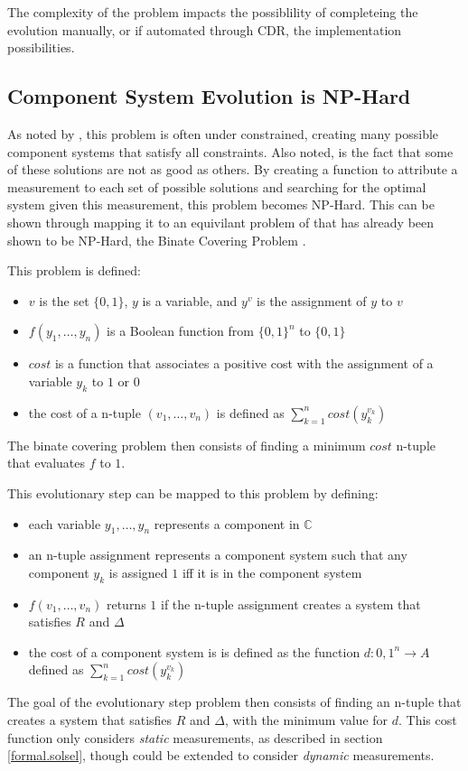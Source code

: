 The complexity of the problem impacts the possiblility of completeing the evolution manually, or if automated through CDR, the implementation possibilities.

\subsection{Component System Evolution is NP-Hard}
As noted by \cite{leberre2008}, this problem is often under constrained, creating many possible component systems that satisfy all constraints.
Also noted, is the fact that some of these solutions are not as good as others.
By creating a function to attribute a measurement to each set of possible solutions and searching for the optimal system given this measurement, this problem becomes NP-Hard. 
This can be shown through mapping it to an equivilant problem of that has already been shown to be NP-Hard, the Binate Covering Problem \cite{Coudert1996}.

This problem is defined:
\begin{itemize}
  \item $v$ is the set $\{0,1\}$, $y$ is a variable, and $y^v$ is the assignment of $y$ to $v$
  \item $f(y_1, \ldots, y_n)$ is a Boolean function from $\{0,1\}^n$ to $\{0,1\}$
  \item $cost$ is a function that associates a positive cost with the assignment of a variable $y_k$ to $1$ or $0$
  \item the cost of a n-tuple $(v_1,\ldots,v_n)$ is defined as $\sum^n_{k=1}cost(y^{v_k}_{k})$
\end{itemize}
The binate covering problem then consists of finding a minimum $cost$ n-tuple that evaluates $f$ to $1$.

This evolutionary step can be mapped to this problem by defining:
\begin{itemize}
  \item each variable $y_1,\ldots,y_n$ represents a component in $\mathbb{C}$
  \item an n-tuple assignment represents a component system such that any component $y_k$ is assigned $1$ iff it is in the component system 
  \item $f(v_1,\ldots,v_n)$ returns $1$ if the n-tuple assignment creates a system that satisfies $R$ and $\Delta$
  \item the cost of a component system is is defined as the function $d : {0,1}^n \rightarrow A$ defined as $\sum^n_{k=1}cost(y^{v_k}_{k})$
\end{itemize}
The goal of the evolutionary step problem then consists of finding an n-tuple that creates a system that satisfies $R$ and $\Delta$,
with the minimum value for $d$.
This cost function only considers \textit{static} measurements, as described in section \ref{formal.solsel}, though could be extended to consider \textit{dynamic} measurements.

